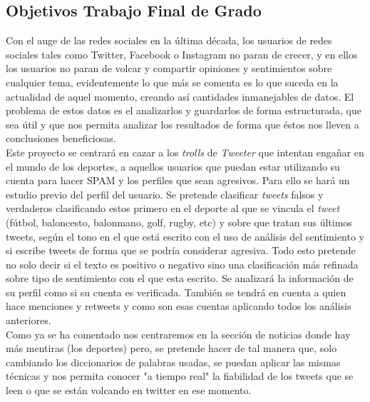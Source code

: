 \documentclass[../all.tex]{subfiles}
\begin{document}
\subsection{Objetivos Trabajo Final de Grado}
    Con el auge de las redes sociales en la última década, los usuarios de redes sociales tales como Twitter, Facebook o Instagram no paran de crecer, y en ellos los usuarios no paran de volcar y compartir opiniones y sentimientos sobre cualquier tema, evidentemente lo que más se comenta es lo que suceda en la actualidad de aquel momento, creando así cantidades inmanejables de datos. El problema de estos datos es el analizarlos y guardarlos de forma estructurada, que sea útil y que nos permita analizar los resultados de forma que éstos nos lleven a conclusiones beneficiosas.\\
   
    Este proyecto se centrará en cazar a los \textit{trolls} de \textit{Tweeter} que  intentan engañar en el mundo de los deportes, a aquellos usuarios que puedan estar utilizando su cuenta para hacer SPAM y los perfiles que sean agresivos. Para ello se hará un estudio previo del perfil del usuario. Se pretende clasificar \textit{tweets} falsos y verdaderos clasificando estos primero en el deporte al que se vincula el \textit{tweet} (fútbol, baloncesto, balonmano, golf, rugby, etc) y sobre que tratan sus últimos tweets, según el tono en el que está escrito con el uso de análisis del sentimiento y si escribe tweets de forma que se podría considerar agresiva. Todo esto pretende no solo decir si el texto es positivo o negativo sino una clasificación más refinada sobre tipo de sentimiento con el que esta escrito. Se analizará la información de su perfil como si su cuenta es verificada. También se tendrá en cuenta a quien hace menciones y retweets y como son esas cuentas aplicando todos los análisis anteriores.\\
    
    Como ya se ha comentado nos centraremos en la sección de noticias donde hay más mentiras (los deportes) pero, se pretende hacer de tal manera que, solo cambiando los diccionarios de palabras usadas, se puedan aplicar las mismas técnicas y nos permita conocer "a tiempo real" la fiabilidad de los tweets que se leen o que se están volcando en twitter en ese momento.\\
    
\end{document}
